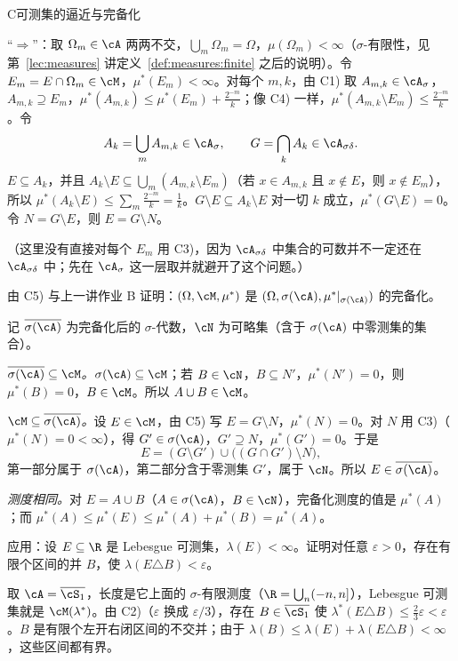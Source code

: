 \begin{probleme}{C}{可测集的逼近与完备化}
\begin{questions}
\begin{solution}
“$\Rightarrow$”：取 $\Omega_m\in\cA$ 两两不交，$\bigcup_m\Omega_m=\Omega$，$\mu(\Omega_m)<\infty$（$\sigma$-有限性，见第~\ref{lec:measures} 讲定义~\ref{def:measures:finite} 之后的说明）。令 $E_m=E\cap\Omega_m\in\cM$，$\mu^*(E_m)<\infty$。对每个 $m,k$，由 C1) 取 $A_{m,k}\in\cA_\sigma$，$A_{m,k}\supseteq E_m$，$\mu^*(A_{m,k})\leqslant\mu^*(E_m)+\frac{2^{-m}}k$；像 C4) 一样，$\mu^*(A_{m,k}\setminus E_m)\leqslant\frac{2^{-m}}k$。令
\[
A_k=\bigcup_mA_{m,k}\in\cA_\sigma,\qquad G=\bigcap_kA_k\in\cA_{\sigma\delta}.
\]
$E\subseteq A_k$，并且 $A_k\setminus E\subseteq\bigcup_m(A_{m,k}\setminus E_m)$（若 $x\in A_{m,k}$ 且 $x\notin E$，则 $x\notin E_m$），所以 $\mu^*(A_k\setminus E)\leqslant\sum_m\frac{2^{-m}}k=\frac1k$。$G\setminus E\subseteq A_k\setminus E$ 对一切 $k$ 成立，$\mu^*(G\setminus E)=0$。令 $N=G\setminus E$，则 $E=G\setminus N$。

（这里没有直接对每个 $E_m$ 用 C3)，因为 $\cA_{\sigma\delta}$ 中集合的可数并不一定还在 $\cA_{\sigma\delta}$ 中；先在 $\cA_\sigma$ 这一层取并就避开了这个问题。）
\end{solution}
\item 由 C5) 与上一讲作业 B 证明：$(\Omega,\cM,\mu^*)$ 是 $(\Omega,\sigma(\cA),\mu^*|_{\sigma(\cA)})$ 的完备化。
\begin{solution}
记 $\overline{\sigma(\cA)}$ 为完备化后的 $\sigma$-代数，$\cN$ 为可略集（含于 $\sigma(\cA)$ 中零测集的集合）。

\emph{$\overline{\sigma(\cA)}\subseteq\cM$。}$\sigma(\cA)\subseteq\cM$；若 $B\in\cN$，$B\subseteq N'$，$\mu^*(N')=0$，则 $\mu^*(B)=0$，$B\in\cM$。所以 $A\cup B\in\cM$。

\emph{$\cM\subseteq\overline{\sigma(\cA)}$。}设 $E\in\cM$，由 C5) 写 $E=G\setminus N$，$\mu^*(N)=0$。对 $N$ 用 C3)（$\mu^*(N)=0<\infty$），得 $G'\in\sigma(\cA)$，$G'\supseteq N$，$\mu^*(G')=0$。于是
\[
E=(G\setminus G')\cup\bigl((G\cap G')\setminus N\bigr),
\]
第一部分属于 $\sigma(\cA)$，第二部分含于零测集 $G'$，属于 $\cN$。所以 $E\in\overline{\sigma(\cA)}$。

\emph{测度相同。}对 $E=A\cup B$（$A\in\sigma(\cA)$，$B\in\cN$），完备化测度的值是 $\mu^*(A)$；而 $\mu^*(A)\leqslant\mu^*(E)\leqslant\mu^*(A)+\mu^*(B)=\mu^*(A)$。
\end{solution}
\item 应用：设 $E\subseteq\R$ 是 Lebesgue 可测集，$\lambda(E)<\infty$。证明对任意 $\varepsilon>0$，存在有限个区间的并 $B$，使 $\lambda(E\triangle B)<\varepsilon$。
\begin{solution}
取 $\cA=\overline{\cS_1}$，长度是它上面的 $\sigma$-有限测度（$\R=\bigcup_n(-n,n]$），Lebesgue 可测集就是 $\cM(\lambda^*)$。由 C2)（$\varepsilon$ 换成 $\varepsilon/3$），存在 $B\in\overline{\cS_1}$ 使 $\lambda^*(E\triangle B)\leqslant\frac23\varepsilon<\varepsilon$。$B$ 是有限个左开右闭区间的不交并；由于 $\lambda(B)\leqslant\lambda(E)+\lambda(E\triangle B)<\infty$，这些区间都有界。


\end{solution}
\end{questions}
\end{probleme}
